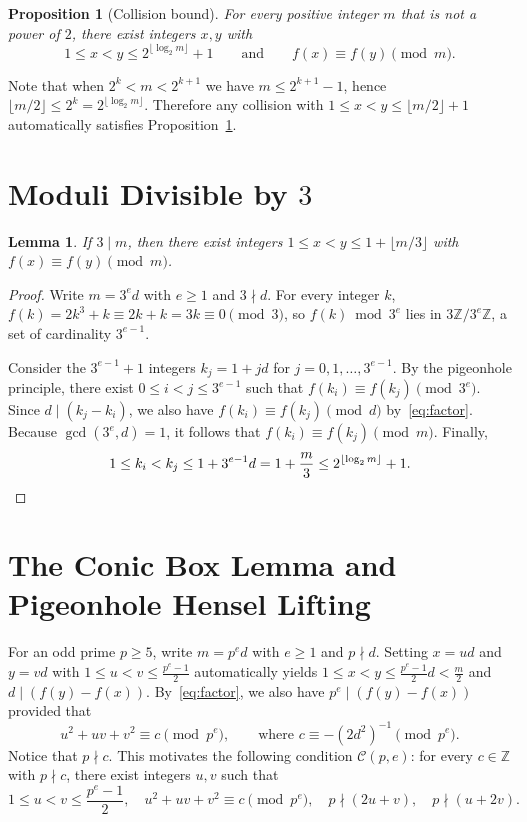 \documentclass[11pt,reqno]{amsart}
\newtheorem{lemma}[theorem]{Lemma}
\newtheorem{proposition}[theorem]{Proposition}
\theoremstyle{remark}
\newcommand{\Z}{\mathbb{Z}}
\begin{document}
\begin{proposition}[Collision bound]\label{prop:collision}
For every positive integer $m$ that is not a power of $2$, there exist integers $x, y$ with
\[
1 \le x < y \le 2^{\lfloor \log_2 m \rfloor} + 1
\qquad\text{and}\qquad
f(x) \equiv f(y) \pmod m.
\]
\end{proposition}

Note that when $2^k < m < 2^{k+1}$ we have $m \le 2^{k+1} - 1$, hence $\lfloor m/2 \rfloor \le 2^k = 2^{\lfloor \log_2 m \rfloor}$. Therefore any collision with $1 \le x < y \le \lfloor m/2 \rfloor + 1$ automatically satisfies Proposition~\ref{prop:collision}.

\section{Moduli Divisible by $3$}

\begin{lemma}\label{lem:three}
If $3 \mid m$, then there exist integers $1 \le x < y \le 1 + \lfloor m/3 \rfloor$ with $f(x) \equiv f(y) \pmod m$.
\end{lemma}

\begin{proof}
Write $m = 3^e d$ with $e \ge 1$ and $3 \nmid d$. For every integer $k$, $f(k) = 2k^3 + k \equiv 2k + k = 3k \equiv 0 \pmod 3$, so $f(k) \bmod 3^e$ lies in $3\Z/3^e\Z$, a set of cardinality $3^{e-1}$.

Consider the $3^{e-1} + 1$ integers $k_j = 1 + j d$ for $j = 0, 1, \dots, 3^{e-1}$. By the pigeonhole principle, there exist $0 \le i < j \le 3^{e-1}$ such that $f(k_i) \equiv f(k_j) \pmod{3^e}$. Since $d \mid (k_j - k_i)$, we also have $f(k_i) \equiv f(k_j) \pmod d$ by~\eqref{eq:factor}. Because $\gcd(3^e, d) = 1$, it follows that $f(k_i) \equiv f(k_j) \pmod m$. Finally,
\[
1 \le k_i < k_j \le 1 + 3^{e-1} d = 1 + \frac{m}{3} \le 2^{\lfloor \log_2 m \rfloor} + 1. \qedhere
\]
\end{proof}

\section{The Conic Box Lemma and Pigeonhole Hensel Lifting}

For an odd prime $p \ge 5$, write $m = p^e d$ with $e \ge 1$ and $p \nmid d$. Setting $x = ud$ and $y = vd$ with $1 \le u < v \le \frac{p^e - 1}{2}$ automatically yields $1 \le x < y \le \frac{p^e - 1}{2} d < \frac{m}{2}$ and $d \mid (f(y) - f(x))$. By~\eqref{eq:factor}, we also have $p^e \mid (f(y) - f(x))$ provided that
\begin{equation}\label{eq:conic}
u^2 + uv + v^2 \equiv c \pmod{p^e}, \qquad\text{where } c \equiv -(2d^2)^{-1} \pmod{p^e}.
\end{equation}
Notice that $p \nmid c$. This motivates the following condition $\mathcal{C}(p, e)$: for every $c \in \Z$ with $p \nmid c$, there exist integers $u, v$ such that
\begin{equation}\label{eq:conicbox}
1 \le u < v \le \frac{p^e - 1}{2}, \quad
u^2 + uv + v^2 \equiv c \pmod{p^e}, \quad
p \nmid (2u + v), \quad p \nmid (u + 2v).
\end{equation}
\end{document}
